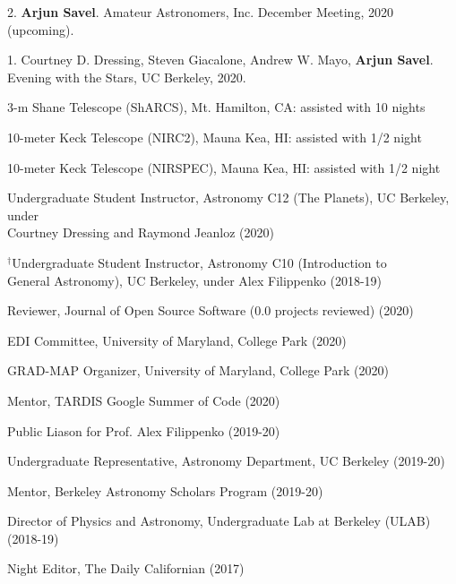 \documentclass[12pt,letterpaper]{article}
\begin{document}
\begin{list}{}{\cvlist}
\item 2. \textbf{Arjun Savel}. Amateur Astronomers, Inc. December Meeting, 2020 (upcoming).
\item 1. Courtney D. Dressing, Steven Giacalone, Andrew W. Mayo, \textbf{Arjun Savel}. Evening with the Stars, UC Berkeley, 2020.
\end{list}



\begin{list}{}{\cvlist}

\item 3-m Shane Telescope (ShARCS), Mt. Hamilton, CA: assisted with 10 nights
\item 10-meter Keck Telescope (NIRC2), Mauna Kea, HI: assisted with 1/2 night
\item 10-meter Keck Telescope (NIRSPEC), Mauna Kea, HI: assisted with 1/2 night

\end{list}


\begin{list}{}{\cvlist}
\item Undergraduate Student Instructor, Astronomy C12 (The Planets), UC Berkeley, under \\ Courtney Dressing and Raymond Jeanloz (2020)
\item $^\dagger$Undergraduate Student Instructor, Astronomy C10 (Introduction to \\ General Astronomy), UC Berkeley, under Alex Filippenko (2018-19)
\end{list}

\begin{list}{}{\cvlist}
\item Reviewer, Journal of Open Source Software (0.0 projects reviewed) (2020)
\item EDI Committee, University of Maryland, College Park (2020)
\item GRAD-MAP Organizer, University of Maryland, College Park (2020)
\item Mentor, TARDIS Google Summer of Code (2020)
\item Public Liason for Prof. Alex Filippenko (2019-20)
\item Undergraduate Representative, Astronomy Department, UC Berkeley (2019-20)
\item Mentor, Berkeley Astronomy Scholars Program (2019-20)
\item Director of Physics and Astronomy, Undergraduate Lab at Berkeley (ULAB) (2018-19)
\item Night Editor, The Daily Californian (2017)
\end{list}
\end{document}
